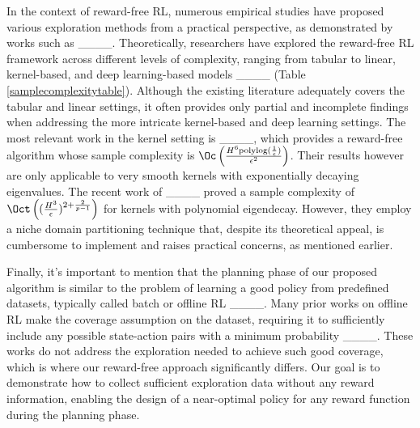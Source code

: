 In the context of reward-free RL, numerous empirical studies have proposed various exploration methods from a practical perspective, as demonstrated by works such as ____. Theoretically, researchers have explored the reward-free RL framework across different levels of complexity, ranging from tabular to linear, kernel-based, and deep learning-based models ____ (Table \ref{samplecomplexitytable}). %
Although the existing literature adequately covers the tabular and linear settings, it often provides only partial and incomplete findings when addressing the more intricate kernel-based and deep learning settings. The most relevant work in the kernel setting is ____, which provides a reward-free algorithm whose sample complexity is $\Oc\left(\frac{H^6 \text{polylog} (\frac{1}{\epsilon})}{\epsilon^2}\right)$. Their results however are only applicable to very smooth kernels with exponentially decaying eigenvalues. The recent work of ____ proved a sample complexity of $\Oct\left((\frac{H^3}{\epsilon})^{2+\frac{2}{p-1}}\right)$ for kernels with polynomial eigendecay. However, they employ a niche domain partitioning technique that, despite its theoretical appeal, is cumbersome to implement and raises practical concerns, as mentioned earlier.

Finally, it's important to mention that the planning phase of our proposed algorithm is similar to the problem of learning a good policy from predefined datasets, typically called batch or offline RL ____. Many prior works on offline RL make the coverage assumption on the dataset, requiring it to sufficiently include any possible state-action pairs with a minimum probability ____. These works do not address the exploration needed to achieve such good coverage, which is where our reward-free approach significantly differs. Our goal is to demonstrate how to collect sufficient exploration data without any reward information, enabling the design of a near-optimal policy for any reward function during the planning phase.
%